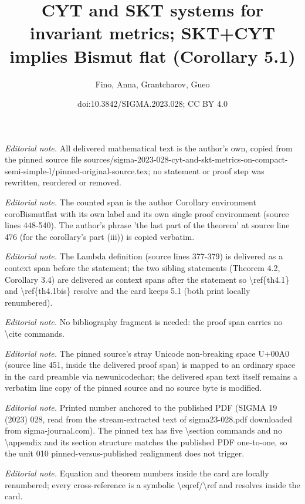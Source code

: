 \documentclass[10pt,a4paper]{article}
\title{CYT and SKT systems for invariant metrics; SKT+CYT implies Bismut flat (Corollary 5.1)}
\author{Fino, Anna, Grantcharov, Gueo}
\date{doi:10.3842/SIGMA.2023.028; CC BY 4.0}
\numberwithin{equation}{section}
\theoremstyle{definition}
\begin{document}
\maketitle
\setcounter{section}{5}
\setcounter{Theorem}{0}
\noindent\textit{Editorial note.} All delivered mathematical text is the author's own, copied from the pinned source file sources/sigma-2023-028-cyt-and-skt-metrics-on-compact-semi-simple-l/pinned-original-source.tex; no statement or proof step was rewritten, reordered or removed.\par\medskip
\noindent\textit{Editorial note.} The counted span is the author Corollary environment coroBismutflat with its own label and its own single proof environment (source lines 448-540). The author's phrase 'the last part of the theorem' at source line 476 (for the corollary's part (iii)) is copied verbatim.\par\medskip
\noindent\textit{Editorial note.} The Lambda definition (source lines 377-379) is delivered as a context span before the statement; the two sibling statements (Theorem 4.2, Corollary 3.4) are delivered as context spans after the statement so \textbackslash{}ref\{th4.1\} and \textbackslash{}ref\{th4.1bis\} resolve and the card keeps 5.1 (both print locally renumbered).\par\medskip
\noindent\textit{Editorial note.} No bibliography fragment is needed: the proof span carries no \textbackslash{}cite commands.\par\medskip
\noindent\textit{Editorial note.} The pinned source's stray Unicode non-breaking space U+00A0 (source line 451, inside the delivered proof span) is mapped to an ordinary space in the card preamble via newunicodechar; the delivered span text itself remains a verbatim line copy of the pinned source and no source byte is modified.\par\medskip
\noindent\textit{Editorial note.} Printed number anchored to the published PDF (SIGMA 19 (2023) 028, read from the stream-extracted text of sigma23-028.pdf downloaded from sigma-journal.com). The pinned tex has five \textbackslash{}section commands and no \textbackslash{}appendix and its section structure matches the published PDF one-to-one, so the unit 010 pinned-versus-published realignment does not trigger.\par\medskip
\noindent\textit{Editorial note.} Equation and theorem numbers inside the card are locally renumbered; every cross-reference is a symbolic \textbackslash{}eqref/\textbackslash{}ref and resolves inside the card.\par\medskip
\end{document}
